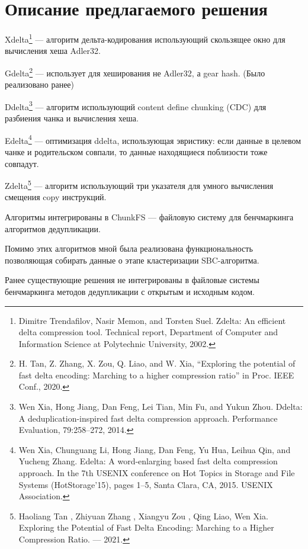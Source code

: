 \documentclass[a4paper]{article}
\begin{document}
\section{Описание предлагаемого решения}


Xdelta\footnote{Dimitre Trendafilov, Nasir Memon, and Torsten Suel. Zdelta: An efficient delta compression tool. Technical report,
Department of Computer and Information Science at Polytechnic University, 2002.} — алгоритм дельта-кодирования использующий скользящее окно для вычисления хеша Adler32.

Gdelta\footnote{H. Tan, Z. Zhang, X. Zou, Q. Liao, and W. Xia, “Exploring the potential of fast delta encoding: Marching to a higher compression ratio” in Proc. IEEE Conf., 2020.} — использует для хеширования не Adler32, а gear hash. (Было реализовано ранее)

Ddelta\footnote{Wen Xia, Hong Jiang, Dan Feng, Lei Tian, Min Fu, and Yukun Zhou. Ddelta: A deduplication-inspired fast delta compression approach. Performance Evaluation,
79:258–272, 2014.} — алгоритм использующий content define chunking (CDC) для разбиения чанка и вычисления хеша.

Edelta\footnote{Wen Xia, Chunguang Li, Hong Jiang, Dan Feng, Yu Hua, Leihua Qin, and Yucheng Zhang. Edelta: A word-enlarging based fast delta compression approach. In the
7th USENIX conference on Hot Topics in Storage and File Systems (HotStorage’15), pages 1–5, Santa Clara, CA, 2015. USENIX Association.} — оптимизация ddelta, использующая эвристику: если данные в целевом чанке и родительском совпали, то данные находящиеся поблизости тоже совпадут.

Zdelta\footnote{Haoliang Tan , Zhiyuan Zhang , Xiangyu Zou , Qing Liao, Wen Xia. Exploring the Potential of Fast Delta Encoding: Marching to a Higher Compression Ratio. — 2021.} — алгоритм использующий три указателя для умного вычисления смещения copy инструкций.

Алгоритмы интегрированы в ChunkFS — файловую систему для бенчмаркинга алгоритмов
дедупликации.

Помимо этих алгоритмов мной была реализована функциональность позволяющая собирать данные о этапе кластеризации SBC-алгоритма.

Ранее существующие решения не интегрированы в файловые системы бенчмаркинга методов дедупликации с открытым и исходным кодом.
\end{document}

